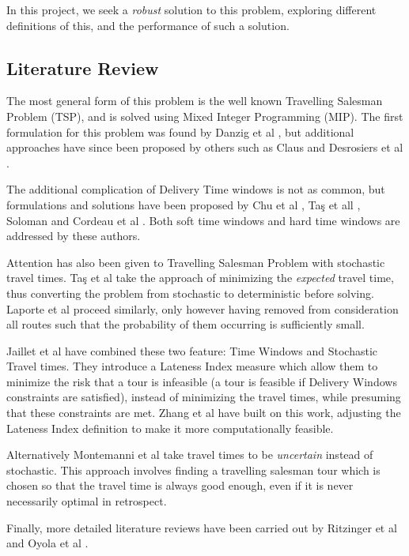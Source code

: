 In this project, we seek a \textit{robust} solution to this problem, exploring different definitions of this, and the performance of such a solution.
\subsection{Literature Review}
\label{sec:review}
The most general form of this problem is the well known Travelling Salesman Problem (TSP), and is solved using Mixed Integer Programming (MIP). The first formulation for this problem was found by Danzig et al \cite{dantzig1954solution}, but additional approaches have since been proposed by others such as Claus \cite{claus1984new} and Desrosiers et al \cite{desrosiers1983plus}.

The additional complication of Delivery Time windows is not as common, but formulations and solutions have been proposed by Chu et al \cite{chu2017multi}, Ta\c s et all \cite{tacs2014vehicle}, Soloman \cite{solomon1987algorithms} and Cordeau et al \cite{Cordeau2001}. Both soft time windows and hard time windows are addressed by these authors.

Attention has also been given to Travelling Salesman Problem with stochastic travel times. Ta\c s et al \cite{tacs2014vehicle} take the approach of minimizing the \textit{expected} travel time, thus converting the problem from stochastic to deterministic before solving. Laporte et al \cite{laporte1992vehicle} proceed similarly, only however having removed from consideration all routes such that the probability of them occurring is sufficiently small. 

Jaillet et al \cite{jaillet2016routing} have combined these two feature: Time Windows and Stochastic Travel times. They introduce a Lateness Index measure which allow them to minimize the risk that a tour is infeasible (a tour is feasible if Delivery Windows constraints are satisfied), instead of minimizing the travel times, while presuming that these constraints are met. Zhang et al \cite{zhangrouting} have built on this work, adjusting the Lateness Index definition to make it more computationally feasible.

Alternatively Montemanni et al \cite{montemanni2007robust} take travel times to be \textit{uncertain} instead of stochastic. This approach involves finding a travelling salesman tour which is chosen so that the travel time is always good enough, even if it is never necessarily optimal in retrospect. 

Finally, more detailed literature reviews have been carried out by Ritzinger et al \cite{ritzinger2016survey} and Oyola et al \cite{oyola2016stochastic}.

